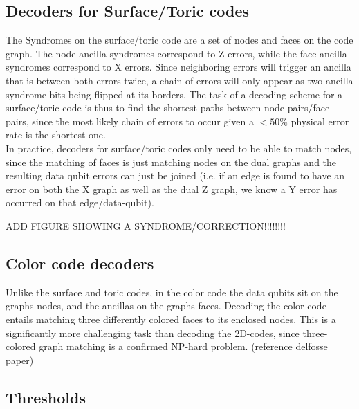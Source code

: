 \subsection{Decoders for Surface/Toric codes}
The Syndromes on the surface/toric code are a set of nodes and
faces on the code graph. The node ancilla syndromes correspond to
Z errors, while the face ancilla syndromes correspond to X errors.
Since neighboring errors will trigger an ancilla that is between 
both errors twice, a chain of errors will only appear as two ancilla
syndrome bits being flipped at its borders.
The task of a decoding scheme for a surface/toric code is thus to
find the shortest paths between node pairs/face pairs, since the most likely
chain of errors to occur given a $<50\%$ physical error rate is the 
shortest one.\\
In practice, decoders for surface/toric codes only need to be able to
match nodes, since the matching of faces is just matching nodes on the 
dual graphs and the resulting data qubit errors can just be joined
(i.e. if an edge is found to have an error on both the X graph as well as the
dual Z graph, we know a Y error has occurred on that edge/data-qubit).

ADD FIGURE SHOWING A SYNDROME/CORRECTION!!!!!!!! 



\subsection{Color code decoders}
Unlike the surface and toric codes, in the color code the 
data qubits sit on the graphs nodes, and the ancillas on the 
graphs faces. Decoding the color code entails matching 
three differently colored faces to its enclosed nodes.
This is a significantly more challenging task than
decoding the 2D-codes, since three-colored graph matching is a confirmed
NP-hard problem. (reference delfosse paper)



\subsection{Thresholds}
